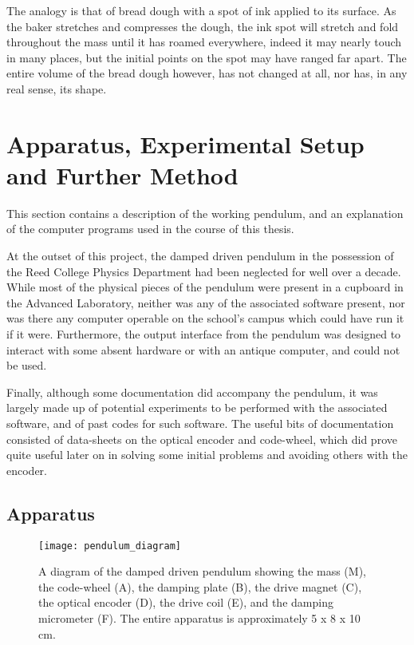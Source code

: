 \documentclass[12pt,twoside]{reedthesis}
\begin{document}
The analogy is that of bread dough with a spot of ink applied to its surface.  As the baker stretches and compresses the dough, the ink spot will stretch and fold throughout the mass until it has roamed everywhere, indeed it may nearly touch in many places, but the initial points on the spot may have ranged far apart.  The entire volume of the bread dough however, has not changed at all, nor has, in any real sense, its shape.  











\chapter{Apparatus, Experimental Setup and Further Method}


This section contains a description of the working pendulum, and an explanation of the computer programs used in the course of this thesis.  

At the outset of this project, the damped driven pendulum in the possession of the Reed College Physics Department had been neglected for well over a decade.  While most of the physical pieces of the pendulum were present in a cupboard in the Advanced Laboratory, neither was any of the associated software present, nor was there any computer operable on the school's campus which could have run it if it were.  Furthermore, the output interface from the pendulum was designed to interact with some absent hardware or with an antique computer, and could not be used.  

Finally, although some documentation did accompany the pendulum, it was largely made up of potential experiments to be performed with the associated software, and of past codes for such software.  The useful bits of documentation consisted of data-sheets on the optical encoder and code-wheel, which did prove quite useful later on in solving some initial problems and avoiding others with the encoder.  



\section{Apparatus}
\begin{figure}[h]
\centering
\texttt{[image: pendulum\_diagram]} 
\caption{A diagram of the damped driven pendulum showing the mass (M), the code-wheel (A), the damping plate (B), the drive magnet (C), the optical encoder (D), the drive coil (E), and the damping micrometer (F).  The entire apparatus is approximately 5 x 8 x 10 cm.}
\label{pendulum_apparatus}
\end{figure}
\end{document}
